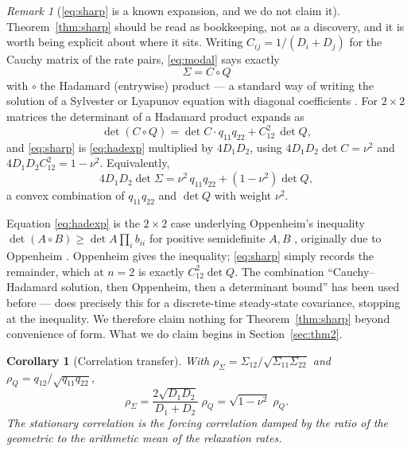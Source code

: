 \documentclass[11pt]{article}
\theoremstyle{plain}
\newtheorem{corollary}[theorem]{Corollary}
\theoremstyle{definition}
\theoremstyle{remark}
\newtheorem{remark}[theorem]{Remark}
\newcommand{\Sig}{\Sigma}
\begin{document}
\begin{remark}[\eqref{eq:sharp} is a known expansion, and we do not claim it]\label{rem:hadamard}
Theorem~\ref{thm:sharp} should be read as bookkeeping, not as a discovery, and it is worth being
explicit about where it sits. Writing $C_{ij}=1/(D_i+D_j)$ for the Cauchy matrix of the rate
pairs, \eqref{eq:modal} says exactly
\begin{equation}
  \Sig = C\circ Q \label{eq:hadamard}
\end{equation}
with $\circ$ the Hadamard (entrywise) product --- a standard way of writing the solution of a
Sylvester or Lyapunov equation with diagonal coefficients
\cite{PalittaLefteriu2022,YadykinEtAl2023}. For $2\times2$ matrices the determinant of a
Hadamard product expands as
\begin{equation}
  \det(C\circ Q) = \det C\cdot q_{11}q_{22} + C_{12}^2\,\det Q, \label{eq:hadexp}
\end{equation}
and \eqref{eq:sharp} is \eqref{eq:hadexp} multiplied by $4D_1D_2$, using
$4D_1D_2\det C=\nu^2$ and $4D_1D_2C_{12}^2=1-\nu^2$. Equivalently,
\begin{equation}
  4D_1D_2\det\Sig = \nu^2\,q_{11}q_{22} + (1-\nu^2)\det Q, \label{eq:convex}
\end{equation}
a convex combination of $q_{11}q_{22}$ and $\det Q$ with weight $\nu^2$.

Equation \eqref{eq:hadexp} is the $2\times2$ case underlying Oppenheim's inequality
$\det(A\circ B)\ge\det A\prod_ib_{ii}$ for positive semidefinite $A,B$
\cite[Thm.~7.8.16, eq.~(7.8.17), p.~509]{HornJohnson2012}, originally due to
Oppenheim \cite{Oppenheim1930}.
Oppenheim gives the inequality; \eqref{eq:sharp} simply records the remainder, which at $n=2$ is
exactly $C_{12}^2\det Q$. The combination ``Cauchy--Hadamard solution, then Oppenheim, then a
determinant bound'' has been used before --- \cite[\S4.5]{SchlickDemissie2011} does precisely
this for a discrete-time steady-state covariance, stopping at the inequality. We therefore claim
nothing for Theorem~\ref{thm:sharp} beyond convenience of form. What we do claim begins in
Section~\ref{sec:thm2}.
\end{remark}

\begin{corollary}[Correlation transfer]\label{cor:rho}
With $\rho_\Sig=\Sig_{12}/\sqrt{\Sig_{11}\Sig_{22}}$ and $\rho_Q=q_{12}/\sqrt{q_{11}q_{22}}$,
\begin{equation}
  \rho_\Sig = \frac{2\sqrt{D_1D_2}}{D_1+D_2}\;\rho_Q = \sqrt{1-\nu^2}\;\rho_Q. \label{eq:rho}
\end{equation}
The stationary correlation is the forcing correlation damped by the ratio of the geometric to
the arithmetic mean of the relaxation rates.
\end{corollary}
\end{document}
